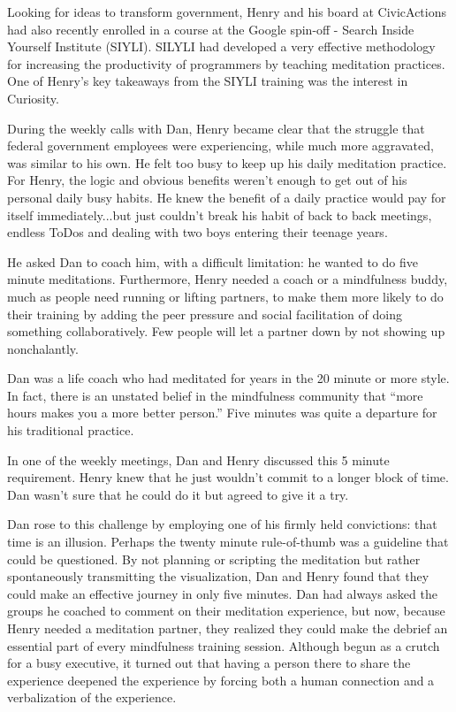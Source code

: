 \documentclass[12pt]{book}
\begin{document}
Looking for ideas to transform government, Henry and his board at
CivicActions had also recently enrolled in a course at the Google
spin-off - Search Inside Yourself Institute (SIYLI). SILYLI had
developed a very effective methodology for increasing the productivity
of programmers by teaching meditation practices. One of Henry's key
takeaways from the SIYLI training was the interest in Curiosity.

During the weekly calls with Dan, Henry became clear that the struggle
that federal government employees were experiencing, while much more
aggravated, was similar to his own. He felt too busy to keep up his
daily meditation practice. For Henry, the logic and obvious benefits
weren't enough to get out of his personal daily busy habits. He knew
the benefit of a daily practice would pay for itself immediately...but
just couldn't break his habit of back to back meetings, endless ToDos
and dealing with two boys entering their teenage years.

He asked Dan to coach him, with a difficult limitation: he wanted to
do five minute meditations. Furthermore, Henry needed a coach or a
mindfulness buddy, much as people need running or lifting partners, to
make them more likely to do their training by adding the peer pressure
and social facilitation of doing something collaboratively. Few people
will let a partner down by not showing up nonchalantly.

Dan was a life coach who had meditated for years in the
20 minute or more style.  In fact, there is an unstated
belief in the mindfulness community that ``more hours makes
you a more better person.'' Five minutes was quite a
departure for his traditional practice.

In one of the weekly meetings, Dan and Henry discussed this 5 minute requirement. Henry knew that he just wouldn't commit to a longer block of time. Dan wasn't sure that he could do it but agreed to give it a try. 

Dan rose to this challenge by employing one of his firmly held convictions: that time is an illusion.
Perhaps the twenty minute rule-of-thumb was a guideline that could be questioned.
By not planning or scripting the meditation but rather spontaneously transmitting
the visualization, Dan and Henry found that they could
make an effective journey in only five minutes.
Dan had always asked the groups he coached to comment on
their meditation experience, but now, because Henry needed a
meditation partner, they realized they could make the debrief
an essential part of every mindfulness training session.
Although begun as a crutch for a busy executive, it turned
out that having a person there to share the experience deepened
the experience by forcing both a human connection and a verbalization
of the experience.
\end{document}
